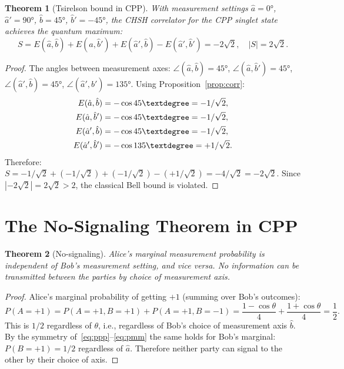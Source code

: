 \documentclass[11pt,a4paper]{article}
\newtheorem{theorem}{Theorem}[section]
\begin{document}
\begin{theorem}[Tsirelson bound in CPP]
\label{thm:tsirelson}
With measurement settings
$\hat{a} = 0°$, $\hat{a}' = 90°$, $\hat{b} = 45°$, $\hat{b}' = -45°$,
the CHSH correlator for the CPP singlet state achieves the quantum maximum:
\begin{equation}
S = E(\hat{a},\hat{b}) + E(\hat{a},\hat{b}')
  + E(\hat{a}',\hat{b}) - E(\hat{a}',\hat{b}')
  = -2\sqrt{2}, \quad |S| = 2\sqrt{2}.
\label{eq:tsirelson}
\end{equation}
\end{theorem}

\begin{proof}
The angles between measurement axes:
$\angle(\hat{a},\hat{b}) = 45°$,
$\angle(\hat{a},\hat{b}') = 45°$,
$\angle(\hat{a}',\hat{b}) = 45°$,
$\angle(\hat{a}',\hat{b}') = 135°$.
Using Proposition~\ref{prop:corr}:
\begin{align}
E(\hat{a},\hat{b}) &= -\cos 45° = -1/\sqrt{2}, \notag\\
E(\hat{a},\hat{b}') &= -\cos 45° = -1/\sqrt{2}, \notag\\
E(\hat{a}',\hat{b}) &= -\cos 45° = -1/\sqrt{2}, \notag\\
E(\hat{a}',\hat{b}') &= -\cos 135° = +1/\sqrt{2}. \notag
\end{align}
Therefore:
$S = -1/\sqrt{2} + (-1/\sqrt{2}) + (-1/\sqrt{2}) - (+1/\sqrt{2})
   = -4/\sqrt{2} = -2\sqrt{2}$.
Since $|{-2\sqrt{2}}| = 2\sqrt{2} > 2$, the classical Bell bound is violated.
\end{proof}

\section{The No-Signaling Theorem in CPP}
\label{sec:nosig}

\begin{theorem}[No-signaling]
\label{thm:nosig}
Alice's marginal measurement probability is independent of Bob's measurement
setting, and vice versa.  No information can be transmitted between the
parties by choice of measurement axis.
\end{theorem}

\begin{proof}
Alice's marginal probability of getting $+1$ (summing over Bob's outcomes):
\begin{equation}
P(A=+1) = P(A{=}+1,B{=}+1) + P(A{=}+1,B{=}-1)
= \frac{1-\cos\theta}{4} + \frac{1+\cos\theta}{4}
= \frac{1}{2}.
\label{eq:nosig_a}
\end{equation}
This is $1/2$ regardless of $\theta$, i.e., regardless of Bob's choice
of measurement axis $\hat{b}$.  By the symmetry of~\eqref{eq:ppp}--\eqref{eq:pmm}
the same holds for Bob's marginal: $P(B=+1) = 1/2$ regardless of $\hat{a}$.
Therefore neither party can signal to the other by their choice of axis.
\end{proof}
\end{document}
